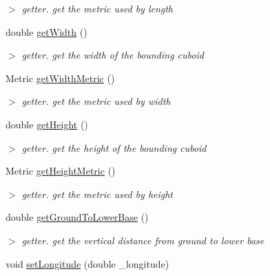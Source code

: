 \begin{DoxyCompactItemize}
\begin{DoxyCompactList}\small\item\em $>$ getter. get the metric used by length \end{DoxyCompactList}\item 
\hypertarget{classCuboid_a2609713a4da6a9fbaabdb7188379dbd1}{double \hyperlink{classCuboid_a2609713a4da6a9fbaabdb7188379dbd1}{get\-Width} ()}\label{classCuboid_a2609713a4da6a9fbaabdb7188379dbd1}

\begin{DoxyCompactList}\small\item\em $>$ getter. get the width of the bounding cuboid \end{DoxyCompactList}\item 
\hypertarget{classCuboid_a008ee0b1d50806842860cb3eed3d0edb}{\-Metric \hyperlink{classCuboid_a008ee0b1d50806842860cb3eed3d0edb}{get\-Width\-Metric} ()}\label{classCuboid_a008ee0b1d50806842860cb3eed3d0edb}

\begin{DoxyCompactList}\small\item\em $>$ getter. get the metric used by width \end{DoxyCompactList}\item 
\hypertarget{classCuboid_a5bb8679b9237b122f1120a185b6bc0c6}{double \hyperlink{classCuboid_a5bb8679b9237b122f1120a185b6bc0c6}{get\-Height} ()}\label{classCuboid_a5bb8679b9237b122f1120a185b6bc0c6}

\begin{DoxyCompactList}\small\item\em $>$ getter. get the height of the bounding cuboid \end{DoxyCompactList}\item 
\hypertarget{classCuboid_a73fa2a69870dac37de851937d5fd3144}{\-Metric \hyperlink{classCuboid_a73fa2a69870dac37de851937d5fd3144}{get\-Height\-Metric} ()}\label{classCuboid_a73fa2a69870dac37de851937d5fd3144}

\begin{DoxyCompactList}\small\item\em $>$ getter. get the metric used by height \end{DoxyCompactList}\item 
\hypertarget{classCuboid_a91c029028720a94825bed667d86dc959}{double \hyperlink{classCuboid_a91c029028720a94825bed667d86dc959}{get\-Ground\-To\-Lower\-Base} ()}\label{classCuboid_a91c029028720a94825bed667d86dc959}

\begin{DoxyCompactList}\small\item\em $>$ getter. get the vertical distance from ground to lower base \end{DoxyCompactList}\item 
\hypertarget{classCuboid_ac5ead5e6e2b5e9a18d7ca5990b38b3e4}{void \hyperlink{classCuboid_ac5ead5e6e2b5e9a18d7ca5990b38b3e4}{set\-Longitude} (double \-\_\-longitude)}\label{classCuboid_ac5ead5e6e2b5e9a18d7ca5990b38b3e4}


\end{DoxyCompactItemize}
